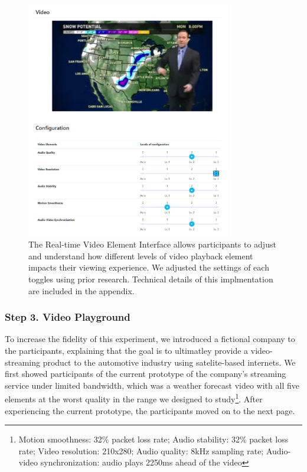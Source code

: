 \begin{figure}[htpb]
    \centering
    \includegraphics[width=0.8\textwidth, keepaspectratio=true]{content/image/video_playground.png}
    \caption{
        The Real-time Video Element Interface allows participants to adjust and understand how different levels of video playback element impacts their viewing experience. We adjusted the settings of each toggles using prior research. Technical details of this implmentation are included in the appendix.
    }
    \label{fig:exp2_playground}
\end{figure}


\subsubsection{Step 3. Video Playground}
To increase the fidelity of this experiment, we introduced a fictional company to the participants, explaining that the goal is to ultimatley provide a video-streaming product to the automotive industry using satelite-based internets. We first showed participants of the current prototype of the company's streaming service under limited bandwidth, which was a weather forecast video with all five elements at the worst quality in the range we designed to study\footnote{Motion smoothness: 32\% packet loss rate; Audio stability: 32\% packet loss rate; Video resolution: 210x280; Audio quality: 8kHz sampling rate; Audio-video synchronization: audio plays 2250ms ahead of the video}. After experiencing the current prototype, the participants moved on to the next page.

